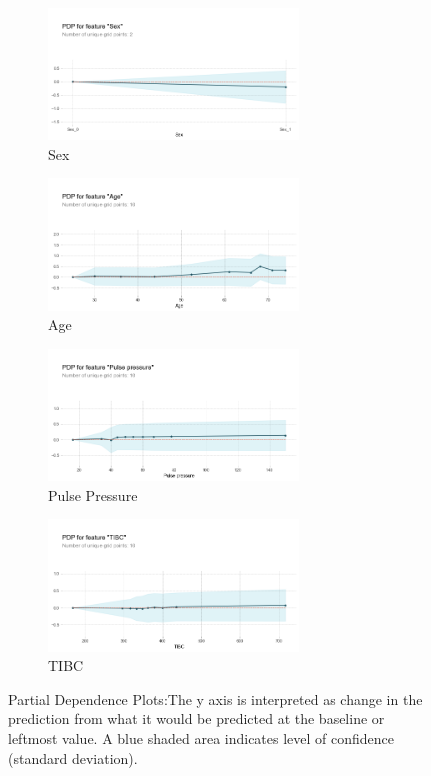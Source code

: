 \documentclass[5 pt]{article}
\begin{document}
\begin{figure}[h]
	\begin{subfigure}{0.5\textwidth}
		\includegraphics[width=1\linewidth, height=3.5cm]{pdpsex.png} 
		\caption{Sex}
	\end{subfigure}
	\begin{subfigure}{0.5\textwidth}
		\includegraphics[width=1\linewidth, height=3.5cm]{pdpage.png}
		\caption{Age}
	\end{subfigure}
	\begin{subfigure}{0.5\textwidth}
		\includegraphics[width=1\linewidth, height=3.5cm]{pdppp.png}
		\caption{Pulse Pressure}
	\end{subfigure}
	\begin{subfigure}{0.5\textwidth}
		\includegraphics[width=1\linewidth, height=3.5cm]{pdptibc.png}
		\caption{TIBC}
	\end{subfigure}
	
\caption{Partial Dependence Plots:The y axis is interpreted as change in the prediction from what it would be predicted at the baseline or leftmost value. A blue shaded area indicates level of confidence (standard deviation). }
\label{fig:image2}
\end{figure}
\end{document}
